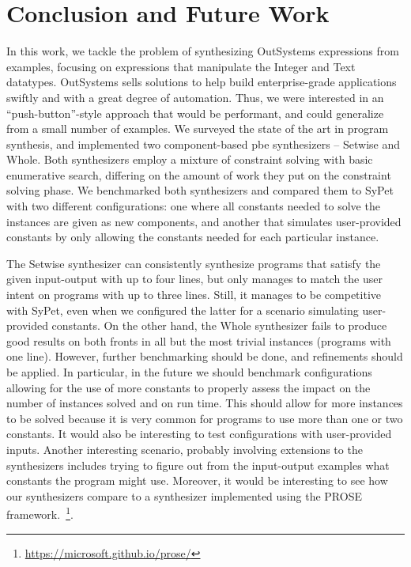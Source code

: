 \section{Conclusion and Future Work}
\label{sec:conclusion}

In this work, we tackle the problem of synthesizing OutSystems expressions from
examples, focusing on expressions that manipulate the Integer and Text
datatypes.
OutSystems sells solutions to help build enterprise-grade applications swiftly
and with a great degree of automation.
Thus, we were interested in an ``push-button''-style approach that would be
performant, and could generalize from a small number of examples.
We surveyed the state of the art in program synthesis, and implemented two
component-based \gls{pbe} synthesizers -- Setwise and Whole.
Both synthesizers employ a mixture of constraint solving with basic enumerative
search, differing on the amount of work they put on the constraint solving
phase.
We benchmarked both synthesizers and compared them to SyPet~\cite{Feng:2017:CSC}
with two different configurations: one where all constants needed to solve the
instances are given as new components, and another that simulates
user-provided constants by only allowing the constants needed for each
particular instance.

The Setwise synthesizer can consistently synthesize programs that satisfy the
given input-output with up to four lines, but only manages to match the user
intent on programs with up to three lines.
Still, it manages to be competitive with SyPet, even when we configured the
latter for a scenario simulating user-provided constants.
On the other hand, the Whole synthesizer fails to produce good results on both
fronts in all but the most trivial instances (programs with one line).
However, further benchmarking should be done, and refinements should be applied.
In particular, in the future we should benchmark configurations allowing for the
use of more constants to properly assess the impact on the number of instances
solved and on run time.
This should allow for more instances to be solved because it is very common for
programs to use more than one or two constants.
It would also be interesting to test configurations with user-provided inputs.
Another interesting scenario, probably involving extensions to the synthesizers
includes trying to figure out from the input-output examples what constants the
program might use.
Moreover, it would be interesting to see how our synthesizers compare to a
synthesizer implemented using the PROSE
framework.~\footnote{\url{https://microsoft.github.io/prose/}}.


